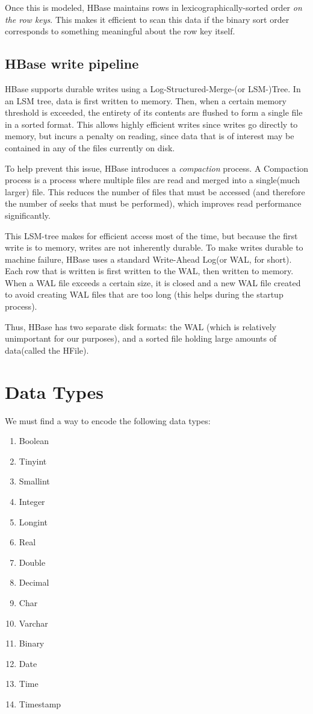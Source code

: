 Once this is modeled, HBase maintains rows in lexicographically-sorted order \emph{on the row keys}. This makes it efficient to scan this data if the binary sort order corresponds to something meaningful about the row key itself.

\subsection{HBase write pipeline}
HBase supports durable writes using a Log-Structured-Merge-(or LSM-)Tree. In an LSM tree, data is first written to memory. Then, when a certain memory threshold is exceeded, the entirety of its contents are flushed to form a single file in a sorted format. This allows highly efficient writes since writes go directly to memory, but incurs a penalty on reading, since data that is of interest may be contained in any of the files currently on disk.

To help prevent this issue, HBase introduces a \emph{compaction} process. A Compaction process is a process where multiple files are read and merged into a single(much larger) file. This reduces the number of files that must be accessed (and therefore the number of seeks that must be performed), which improves read performance significantly. 

This LSM-tree makes for efficient access most of the time, but because the first write is to memory, writes are not inherently durable. To make writes durable to machine failure, HBase uses a standard Write-Ahead Log(or WAL, for short). Each row that is written is first written to the WAL, then written to memory. When a WAL file exceeds a certain size, it is closed and a new WAL file created to avoid creating WAL files that are too long (this helps during the startup process).

Thus, HBase has two separate disk formats: the WAL (which is relatively unimportant for our purposes), and a sorted file holding large amounts of data(called the HFile).  

\section{Data Types}

We must find a way to encode the following data types:
\begin{enumerate}
	\item Boolean
	\item Tinyint
	\item Smallint
	\item Integer
	\item Longint
	\item Real
	\item Double
	\item Decimal
	\item Char
	\item Varchar
	\item Binary
	\item Date
	\item Time
	\item Timestamp
\end{enumerate}

